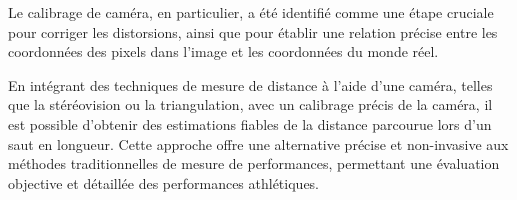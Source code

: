 Le calibrage de caméra, en particulier, a été identifié comme une étape cruciale pour corriger les distorsions, ainsi que pour établir une relation précise entre les coordonnées des pixels dans l'image et les coordonnées du monde réel.  

En intégrant des techniques de mesure de distance à l'aide d'une caméra, telles que la stéréovision ou la triangulation, avec un calibrage précis de la caméra, il est possible d'obtenir des estimations fiables de la distance parcourue lors d'un saut en longueur. Cette approche offre une alternative précise et non-invasive aux méthodes traditionnelles de mesure de performances, permettant une évaluation objective et détaillée des performances athlétiques.
 